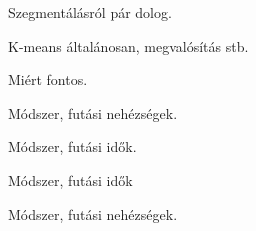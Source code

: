 
Szegmentálásról pár dolog. 


K-means általánosan, megvalósítás stb.


Miért fontos. \cite{tomatoleaf}


Módszer, futási nehézségek.


Módszer, futási idők.


Módszer, futási idők


Módszer, futási nehézségek. 